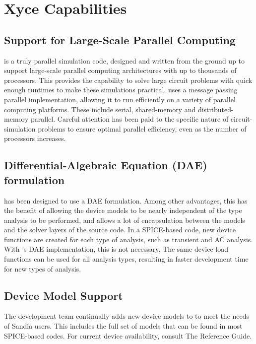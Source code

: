\section{Xyce Capabilities}
\label{Xyce_Capabilities}

\subsection{Support for Large-Scale Parallel Computing}
\label{Parallel_Support}
\Xyce{} is a truly parallel simulation code, designed and written from the
ground up to support large-scale parallel computing architectures with up to thousands of processors.
This provides \Xyce{} the capability to solve large circuit problems 
with quick enough runtimes to make these simulations practical.
\Xyce{} uses a message passing
parallel implementation, allowing it to run
efficiently on a variety of parallel computing platforms.  These
include serial, shared-memory and
distributed-memory parallel.
Careful attention has been paid to the
specific nature of circuit-simulation problems to ensure optimal parallel
efficiency, even as the number of processors increases.

\subsection{Differential-Algebraic Equation (DAE) formulation}
\Xyce{} has been designed to use a DAE formulation.  Among other advantages, 
this has the benefit of allowing the device models to be nearly independent 
of the type analysis to be performed, and allows a lot of encapsulation between
the models and the solver layers of the source code.  In a SPICE-based code,
new device functions are created for each type of analysis, such as transient 
and AC analysis.  With \Xyce{}'s DAE implementation, this is not necessary.
The same device load functions can be used for all analysis types, resulting in
faster development time for new types of analysis.

\subsection{Device Model Support}
The \Xyce{} development team continually adds new device models to \Xyce{} to meet
the needs of Sandia users.  This includes the full set of models that can be found in 
most SPICE-based codes.  For 
current device availability, consult The \Xyce{} Reference Guide\ReferenceGuide{}.

